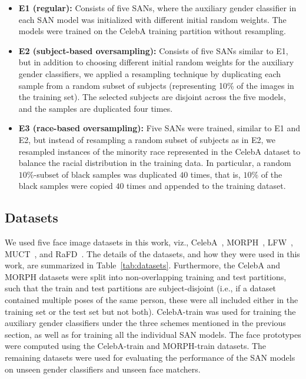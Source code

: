 \documentclass[10pt,twocolumn,letterpaper]{article}
\begin{document}
\begin{itemize}[noitemsep]
\item {\bf E1 (regular):} Consists of five SANs, where the auxiliary gender classifier in each SAN model was initialized with different initial random weights. The models were trained on the CelebA training partition without resampling.
\item {\bf E2 (subject-based oversampling):} Consists of five  SANs similar to E1, but in addition to choosing different initial random weights for the auxiliary gender classifiers, we applied a resampling technique by  duplicating each sample from a random subset of subjects (representing 10\% of the images in the training set).
The selected subjects are disjoint across the five models, and the samples are duplicated four times.
\item {\bf E3 (race-based oversampling):} Five SANs were trained, similar to E1 and E2, but instead of resampling a random subset of subjects as in E2, we resampled instances of the minority race represented in the CelebA dataset to balance the racial distribution in the training data. In particular, a random $10\%$-subset of black samples was duplicated $40$ times, that is, $10\%$ of the black samples were copied $40$ times and appended to the training dataset.
\end{itemize}



\subsection{Datasets}

We used five face image datasets in this work, viz., CelebA~\cite{liu_deep_2015_long}, MORPH~\cite{ricanek_morph_2006}, LFW~\cite{huang_labeled_2007_long}, MUCT~\cite{milborrow_muct_2010}, and RaFD~\cite{langner_presentation_2010}. The details of the datasets, and how they were used in this work, are summarized in Table~\ref{tab:datasets}. Furthermore, the CelebA and MORPH datasets were split into non-overlapping training and test partitions, such that the train and test partitions are subject-disjoint (i.e., if a dataset contained multiple poses of the same person, these were all included either in the training set or the test set but not both). CelebA-train was used for training the auxiliary gender classifiers under the three schemes mentioned in the previous section, as well as for training all the individual SAN models. The face prototypes were computed using the CelebA-train and MORPH-train datasets. The remaining datasets were used for evaluating the performance of the SAN models on unseen gender classifiers and unseen face matchers.
\end{document}
